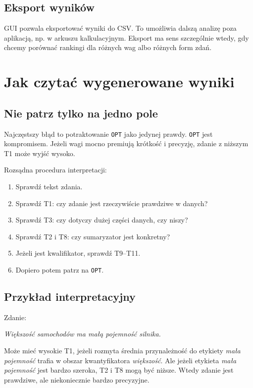 \documentclass[11pt,a4paper]{article}
\newcommand{\code}[1]{\texttt{#1}}
\begin{document}
\subsection{Eksport wyników}

GUI pozwala eksportować wyniki do CSV. To umożliwia dalszą analizę poza aplikacją, np. w arkuszu kalkulacyjnym. Eksport ma sens szczególnie wtedy, gdy chcemy porównać rankingi dla różnych wag albo różnych form zdań.

\section{Jak czytać wygenerowane wyniki}

\subsection{Nie patrz tylko na jedno pole}

Najczęstszy błąd to potraktowanie \code{OPT} jako jedynej prawdy. \code{OPT} jest kompromisem. Jeżeli wagi mocno premiują krótkość i precyzję, zdanie z niższym T1 może wyjść wysoko.

Rozsądna procedura interpretacji:

\begin{enumerate}
    \item Sprawdź tekst zdania.
    \item Sprawdź T1: czy zdanie jest rzeczywiście prawdziwe w danych?
    \item Sprawdź T3: czy dotyczy dużej części danych, czy niszy?
    \item Sprawdź T2 i T8: czy sumaryzator jest konkretny?
    \item Jeżeli jest kwalifikator, sprawdź T9--T11.
    \item Dopiero potem patrz na \code{OPT}.
\end{enumerate}

\subsection{Przykład interpretacyjny}

Zdanie:

\begin{center}
\emph{Większość samochodów ma małą pojemność silnika.}
\end{center}

Może mieć wysokie T1, jeżeli rozmyta średnia przynależność do etykiety \emph{mała pojemność} trafia w obszar kwantyfikatora \emph{większość}. Ale jeżeli etykieta \emph{mała pojemność} jest bardzo szeroka, T2 i T8 mogą być niższe. Wtedy zdanie jest prawdziwe, ale niekoniecznie bardzo precyzyjne.
\end{document}
